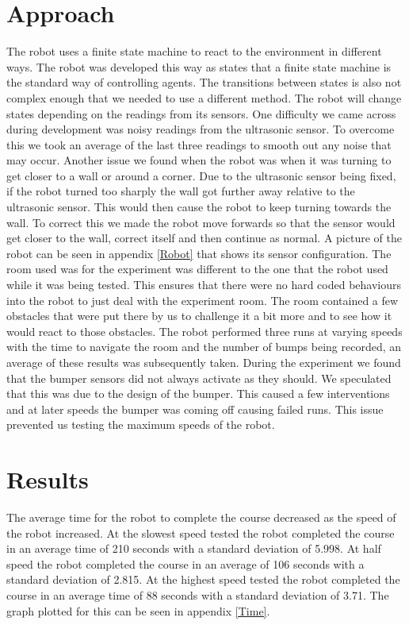 \documentclass[12pt, letterpaper]{article}
\begin{document}
\begin{multicols}{2}
\section{Approach}
The robot uses a finite state machine to react to the environment in different ways. The robot was developed this way as \cite{Bryson} states that a finite state machine is the standard way of controlling agents. The transitions between states is also not complex enough that we needed to use a different method. The robot will change states depending on the readings from its sensors. One difficulty we came across during development was noisy readings from the ultrasonic sensor. To overcome this we took an average of the last three readings to smooth out any noise that may occur. Another issue we found when the robot was when it was turning to get closer to a wall or around a corner. Due to the ultrasonic sensor being fixed, if the robot turned too sharply the wall got further away relative to the ultrasonic sensor. This would then cause the robot to keep turning towards the wall. To correct this we made the robot move forwards so that the sensor would get closer to the wall, correct itself and then continue as normal. A picture of the robot can be seen in appendix \ref{Robot} that shows its sensor configuration.
The room used was for the experiment was different to the one that the robot used while it was being tested. This ensures that there were no hard coded behaviours into the robot to just deal with the experiment room. The room contained a few obstacles that were put there by us to challenge it a bit more and to see how it would react to those obstacles.
The robot performed three runs at varying speeds with the time to navigate the room and the number of bumps being recorded, an average of these results was subsequently taken. During the experiment we found that the bumper sensors did not always activate as they should. We speculated that this was due to the design of the bumper. This caused a few interventions and at later speeds the bumper was coming off causing failed runs. This issue prevented us testing the maximum speeds of the robot.
\section{Results}
The average time for the robot to complete the course decreased as the speed of the robot increased. At the slowest speed tested the robot completed the course in an average time of 210 seconds with a standard deviation of 5.998. At half speed the robot completed the course in an average of 106 seconds with a standard deviation of 2.815. At the highest speed tested the robot completed the course in an average time of 88 seconds with a standard deviation of 3.71. 
The graph plotted for this can be seen in appendix \ref{Time}. 


\end{multicols}
\end{document}
